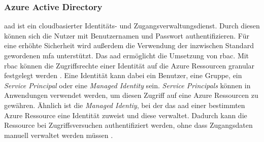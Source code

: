 \subsubsection{Azure Active Directory} \label{subsec:grundlagen:azure:sicherheitUndDatenschutz:aad}
\ac{aad} ist ein cloudbasierter Identitäts- und Zugangsverwaltungsdienst. Durch diesen können sich die Nutzer mit Benutzernamen und Passwort authentifizieren. Für eine erhöhte Sicherheit wird außerdem die Verwendung der inzwischen Standard gewordenen \ac{mfa} unterstützt. Das \ac{aad} ermöglicht die Umsetzung von \ac{rbac}. Mit \ac{rbac} können die Zugriffsrechte einer Identität auf die Azure Ressourcen granular festgelegt werden \cite{stefanovic_azure_2021}. Eine Identität kann dabei ein Benutzer, eine Gruppe, ein \textit{Service Principal} oder eine \textit{Managed Identity} sein. \textit{Service Principals} können in Anwendungen verwendet werden, um diesen Zugriff auf eine Azure Ressourcen zu gewähren. Ähnlich ist die \textit{Managed Identiy}, bei der das \ac{aad} einer bestimmten Azure Ressource eine Identität zuweist und diese verwaltet. Dadurch kann die Ressource bei Zugriffsversuchen authentifiziert werden, ohne dass Zugangsdaten manuell verwaltet werden müssen \cite{copeland_security_2021}.

